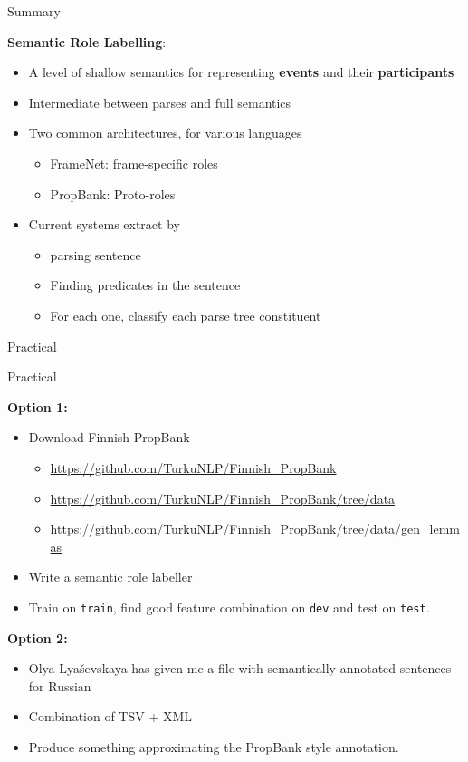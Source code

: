 \documentclass[10pt, compress]{beamer}
\begin{document}
\begin{frame}{Summary}

\textbf{Semantic Role Labelling}:
\begin{itemize}
\item A level of shallow semantics for representing \textbf{events} and their \textbf{participants}
\item Intermediate between parses and full semantics
\item Two common architectures, for various languages
\begin{itemize}
\item FrameNet: frame-specific roles
\item PropBank: Proto-roles
\end{itemize}
\item Current systems extract by 
\begin{itemize}
\item parsing sentence
\item Finding predicates in the sentence
\item For each one, classify each parse tree constituent
\end{itemize}
\end{itemize}
\end{frame}

\begin{frame}[standout]

Practical

\end{frame}

\begin{frame}{Practical}
  
\textbf{Option 1:}
\begin{itemize}
  \item Download Finnish PropBank
  \begin{itemize}
     \item \url{https://github.com/TurkuNLP/Finnish_PropBank} 
     \item \url{https://github.com/TurkuNLP/Finnish_PropBank/tree/data} 
     \item \url{https://github.com/TurkuNLP/Finnish_PropBank/tree/data/gen_lemmas}
  \end{itemize}
  \item Write a semantic role labeller
  \item Train on {\tt train}, find good feature combination on {\tt dev} and test on {\tt test}.
\end{itemize}

\textbf{Option 2:}
\begin{itemize}
  \item Olya Lyaševskaya has given me a file with semantically annotated sentences for Russian
  \item Combination of TSV + XML
  \item Produce something approximating the PropBank style annotation.
\end{itemize} 

\end{frame}
\end{document}
